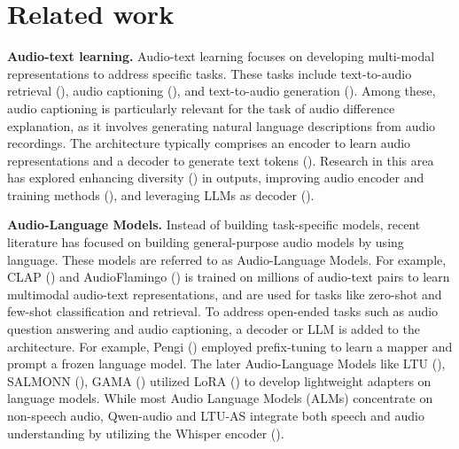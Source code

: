 \section{Related work} \vspace{-0.1in}
\noindent \textbf{Audio-text learning.} Audio-text learning focuses on developing multi-modal representations to address specific tasks. These tasks include text-to-audio retrieval (\cite{deshmukh23_interspeech}), audio captioning (\cite{clotho,mei2022automated}), and text-to-audio generation (\cite{liu2023audioldm}). Among these, audio captioning is particularly relevant for the task of audio difference explanation, as it involves generating natural language descriptions from audio recordings. The architecture typically comprises an encoder to learn audio representations and a decoder to generate text tokens (\cite{drossos2017automated}). Research in this area has explored enhancing diversity (\cite{morato2021diversity, mei2024towards, mei2022diverse}) in outputs, improving audio encoder and training methods (\cite{wu2023beats}), and leveraging LLMs as decoder (\cite{llmcap}).

\noindent \textbf{Audio-Language Models.} Instead of building task-specific models, recent literature has focused on building general-purpose audio models by using language. These models are referred to as Audio-Language Models. For example, CLAP (\cite{msclap1,msclap2,laionclap}) and AudioFlamingo (\cite{audioflamingo}) is trained on millions of audio-text pairs to learn multimodal audio-text representations, and are used for tasks like zero-shot and few-shot classification and retrieval. To address open-ended tasks such as audio question answering and audio captioning, a decoder or LLM is added to the architecture. For example, Pengi (\cite{mspengi}) employed prefix-tuning to learn a mapper and prompt a frozen language model. The later Audio-Language Models like LTU (\cite{ltu,ltuas}), SALMONN (\cite{salmonn}), GAMA (\cite{ghosh2024gama}) utilized LoRA (\cite{hulora}) to develop lightweight adapters on language models. While most Audio Language Models (ALMs) concentrate on non-speech audio, Qwen-audio and LTU-AS integrate both speech and audio understanding by utilizing the Whisper encoder (\cite{radford2023robust}).


